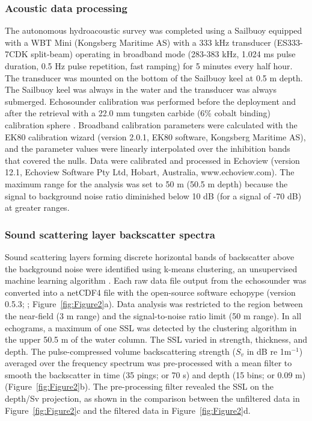\subsubsection{Acoustic data processing}
The autonomous hydroacoustic survey was completed using a Sailbuoy equipped with a WBT Mini (Kongsberg Maritime AS) with a 333 kHz transducer (ES333-7CDK split-beam) operating in broadband mode (283-383 kHz, 1.024 ms pulse duration, 0.5 Hz pulse repetition, fast ramping) for 5 minutes every half hour. The transducer was mounted on the bottom of the Sailbuoy keel at 0.5 m depth. The Sailbuoy keel was always in the water and the transducer was always submerged. Echosounder calibration was performed before the deployment and after the retrieval with a 22.0 mm tungsten carbide (6\% cobalt binding) calibration sphere \citep{Demer2015}. Broadband calibration parameters were calculated with the EK80 calibration wizard (version 2.0.1, EK80 software, Kongsberg Maritime AS), and the parameter values were linearly interpolated over the inhibition bands that covered the nulls. Data were calibrated and processed in Echoview (version 12.1, Echoview Software Pty Ltd, Hobart, Australia, www.echoview.com). The maximum range for the analysis was set to 50 m (50.5 m depth) because the signal to background noise ratio diminished below 10 dB (for a signal of -70 dB) at greater ranges. 
\subsubsection{Sound scattering layer backscatter spectra}
Sound scattering layers forming discrete horizontal bands of backscatter above the background noise \citep{Proud2015} were identified using k-means clustering, an unsupervised machine learning algorithm \citep{Lloyd1982}. Each raw data file output from the echosounder was converted into a netCDF4 file with the open-source software echopype (version 0.5.3; \citep{Lee2021}; Figure~\ref{fig:Figure2}a). Data analysis was restricted to the region between the near-field (3 m range) and the signal-to-noise ratio limit (50 m range). In all echograms, a maximum of one SSL was detected by the clustering algorithm in the upper 50.5 m of the water column. The SSL varied in strength, thickness, and depth. The pulse-compressed volume backscattering strength ($S_{v}$ in dB re 1m$^{-1}$) averaged over the frequency spectrum was pre-processed with a mean filter to smooth the backscatter in time (35 pings; or 70 s) and depth (15 bins; or 0.09 m) (Figure~\ref{fig:Figure2}b). The pre-processing filter revealed the SSL on the depth/Sv projection, as shown in the comparison between the unfiltered data in Figure~\ref{fig:Figure2}c and the filtered data in Figure~\ref{fig:Figure2}d. 
 
